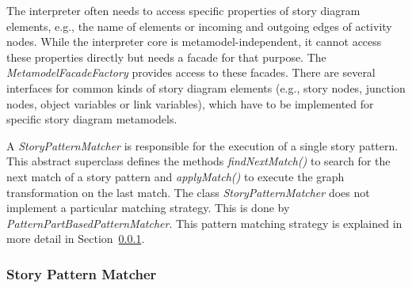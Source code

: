 The interpreter often needs to access specific properties of story diagram elements, e.g., the name of elements or incoming and outgoing edges of activity nodes.
While the interpreter core is metamodel-independent, it cannot access these properties directly but needs a facade for that purpose.
The \emph{MetamodelFacadeFactory} provides access to these facades. 
There are several interfaces for common kinds of story diagram elements (e.g., story nodes, junction nodes, object variables or link variables), which have to be implemented for specific story diagram metamodels.

A \emph{StoryPatternMatcher} is responsible for the execution of a single story pattern. 
This abstract superclass defines the methods \emph{findNextMatch()} to search for the next match of a story pattern and \emph{applyMatch()} to execute the graph transformation on the last match. 
The class \emph{StoryPatternMatcher} does not implement a particular matching strategy. 
This is done by \emph{PatternPartBasedPatternMatcher}. 
This pattern matching strategy is explained in more detail in Section~\ref{sec:story_pattern_matcher}. 


\subsubsection{Story Pattern Matcher}
\label{sec:story_pattern_matcher}

